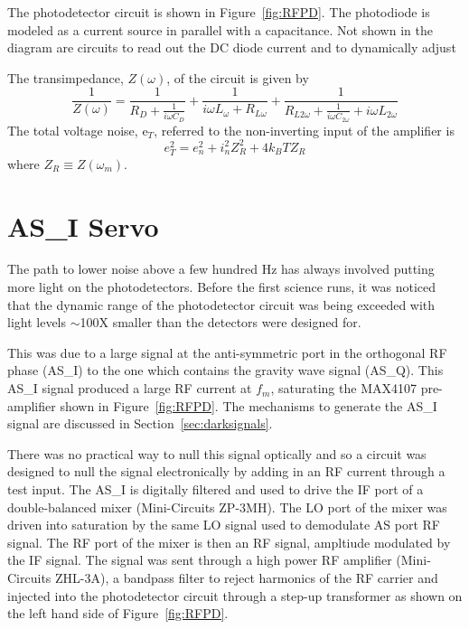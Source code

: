 The photodetector circuit is shown in Figure~\ref{fig:RFPD}. The photodiode is modeled
as a current source in parallel with a capacitance. Not shown in the diagram are
circuits to read out the DC diode current and to dynamically adjust

The transimpedance, $Z(\omega)$, of the circuit is given by
\begin{equation}
\frac{1}{Z(\omega)} = \frac{1}{R_D + \frac{1}{i \omega C_D}}
                    + \frac{1}{i \omega L_{\omega} + R_{L \omega}}
                    + \frac{1}{R_{L 2 \omega} + \frac{1}{i \omega C_{2 \omega}} 
                    + i \omega L_{2 \omega}}
\end{equation}
The total voltage noise, e$_T$, referred to the non-inverting input of the amplifier is
\begin{equation}
e_T^2 = e_n^2 + i_n^2 Z_R^2 + 4 k_B T Z_R
\end{equation}
where $Z_R \equiv Z(\omega_m)$.


\section{AS\_I Servo}
\label{sec:Gorilla}

The path to lower noise above a few hundred Hz has always involved putting more light
on the photodetectors. Before the first science runs, it was noticed that the dynamic
range of the photodetector circuit was being exceeded with light levels $\sim$100X
smaller than the detectors were designed for.

This was due to a large signal at the anti-symmetric port in the orthogonal RF phase
(AS\_I) to the one which contains the gravity wave signal (AS\_Q). This AS\_I
signal produced a large RF current at $f_m$, saturating the MAX4107 pre-amplifier shown 
in Figure~\ref{fig:RFPD}. The mechanisms to generate the AS\_I signal are discussed 
in Section~\ref{sec:darksignals}.

There was no practical way to null this signal optically and so a circuit was designed to
null the signal electronically by adding in an RF current through a test input. 
The AS\_I is digitally filtered and used to drive the IF port of a double-balanced 
mixer (Mini-Circuits ZP-3MH). The LO port of the mixer was driven into saturation
by the same LO signal used to demodulate AS port RF signal. The RF port of the mixer
is then an RF signal, ampltiude modulated by the IF signal. The signal was sent through
a high power RF amplifier (Mini-Circuits ZHL-3A), a bandpass filter to reject harmonics
of the RF carrier and injected into the photodetector circuit through a step-up 
transformer as shown on the left hand side of Figure~\ref{fig:RFPD}.


